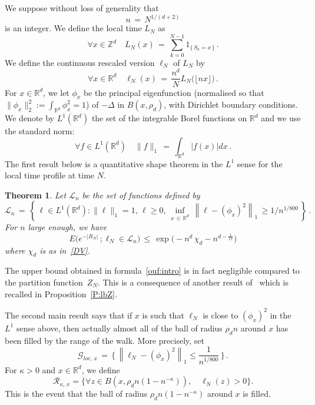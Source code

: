 \documentclass[10pt]{amsart}
\newtheorem{theo}{Theorem}[section]
\theoremstyle{definition}\newtheorem{defi}[theo]{Definition}\newtheorem{rema}[theo]{Remark}\newtheorem{exam}[theo]{Example}\newtheorem{exem}[theo]{Example}\newtheorem{nota}[theo]{Notation}
\newcommand*\Zd {{\mathbb Z^d}}
\newcommand*\Rd {{\mathbb R^d}}
\newcommand*\R{\mathbb{R}}
\newcommand{\cG}{\mathcal{G}}
\newcommand{\cL}{\mathcal{L}}
\newcommand{\cR}{\mathcal{R}}
\let\oldforall\forall
\renewcommand*{\forall}{\mathrel{\oldforall}}
\begin{document}
We suppose without loss of generality that
\[
n\, =\, N^{1/(d+2)}
\]
is an integer. We define the
local time $L_N$ as
\begin{equation*}
\forall x\in\Zd\quad L_N(x)\,=\,
\sum_{k=0}^{N-1}1_{\{\,S_k=x\,\}}\,.
\end{equation*}
We define the continuous rescaled version $\ell_N$ of $L_N$ by
\begin{equation}\label{D:rescaledLN:intro}
\forall x\in\Rd\quad \ell_N(x)\,=\,
\frac{n^d}{N}{L_N\big(\lfloor nx\rfloor\big)}\,.
\end{equation}
For $x \in \R^d$, we let $\phi_x$ be the principal eigenfunction (normalised so that $\|\phi_x\|_2^2 := \int_{\R^d} \phi_x^2 = 1$) of $- \Delta$ in $B(x, \rho_d)$, with Dirichlet boundary conditions. We denote by $L^1(\R^d) $ the set of the integrable Borel functions on $\R^d$ and we use the standard norm:
\[
\forall f \in L^1(\R^d)\quad \|f\|_1\, =\, \int_{\R^d} |f(x)|dx\,.
\]
The first result below is a quantitative shape theorem in the $L^1$ sense for the local time profile at time $N$.

\begin{theo}\label{T:Prop31_intro}
Let $\cL_n$ be the set of functions defined by
\[
\cL_n\,=\,\left\{\,
\ell\in L^1(\Rd): \|\ell\|_1=1,\, \ell\geq 0,\,
\inf_{x\,\in\,\Rd}\,\left\|\ell-(\phi_x)^2\right\|_1\,\geq 1/n^{1/800}\,\right\}\,.
\]
For $n$ large enough, we have
\begin{equation}\label{ouf:intro}
E\big(e^{-|R_N|}\,;
\ell_N\in\cL_n\big)\,\leq\,
\exp\Big(- n^d\,
\chi_d - n^{d-\frac{1}{17}}\Big)
\end{equation}
where $\chi_d$ is as in~\eqref{DV}.
\end{theo}
The upper bound obtained in formula~\eqref{ouf:intro} is in fact negligible compared to the partition function~$Z_N$. This is a consequence of another result of~\cite{BO} which is recalled in Proposition~\ref{P:lbZ}.

The second main result says that if $x$ is such that $\ell_N$ is close to $(\phi_x)^2$ in the $L^1$ sense above, then actually almost all of the ball of radius $\rho_d n$ around $x$ has been filled by the range of the walk. More precisely, set
\[
\cG_{loc,\,x}\,=\,\Big\{\, \left\|\ell_N - (\phi_x)^2 \right\|_1 \le \frac{1}{n^{1/800}}\,\Big\}\,.
\]
For $\kappa>0$ and $x \in \R^d$, we define
\[
\cR_{\kappa,\,x} = \big\{\forall z \in B(x, \rho_d n (1 - n^{- \kappa})),\quad \ell_N(z)>0 \big \}.
\]
This is the event that the ball of radius $\rho_d n (1 - n^{-\kappa})$ around $x$ is filled.
\end{document}
